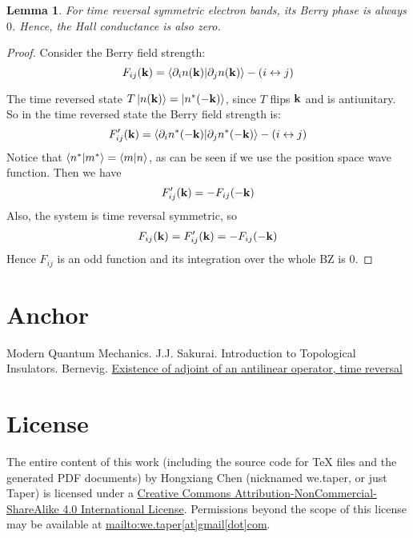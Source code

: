 \documentclass{article}
\numberwithin{equation}{subsection} %
\newtheorem{lemma}{Lemma}[section]
\theoremstyle{definition}
\begin{document}
        \begin{lemma}
            For time reversal symmetric electron bands, its Berry
            phase is always $0$. Hence, the Hall conductance is also
            zero.
        \end{lemma}
        \begin{proof}
            Consider the Berry field strength:
            $$F_{ij}(\vb{k}) = \braket{\partial_i n(\vb{k})|\partial_j
            n(\vb{k})} - (i \leftrightarrow j) $$

            The time reversed state $T\ket{n(\vb{k})}
            =\ket{n^*(-\vb{k})}$, since $T$ flips $\vb{k}$ and is
            antiunitary. So in the time reversed state the Berry field
            strength is:
            $$F'_{ij}(\vb{k}) = \braket{\partial_i n^*(-\vb{k})|\partial_j
            n^*(-\vb{k})} - (i \leftrightarrow j) $$
            Notice that $\braket{n^*|m^*} = \braket{m|n}$, as can be
            seen if we use the position space wave function. Then we
            have
            $$F'_{ij}(\vb{k}) = -F_{ij}(-\vb{k})$$
            Also, the system is time reversal symmetric, so
            \begin{align}
                F_{ij}(\vb{k}) = F'_{ij}(\vb{k}) = -F_{ij}(-\vb{k})
            \end{align}
            Hence $F_{ij}$ is an odd function and its integration over
            the whole BZ is $0$.
        \end{proof}
        
\section{Anchor}
\label{sec:Anchor}
\begin{thebibliography}{1}
     Modern Quantum Mechanics. J.J. Sakurai.
     Introduction to Topological Insulators. Bernevig.
    \href{http://physics.stackexchange.com/questions/45227/existence-of-adjoint-of-an-antilinear-operator-time-reversal}{Existence of adjoint of an antilinear operator, time reversal}
\end{thebibliography}
\printnomenclature
\section{License}
The entire content of this work (including the source code
for TeX files and the generated PDF documents) by 
Hongxiang Chen (nicknamed we.taper, or just Taper) is
licensed under a 
\href{http://creativecommons.org/licenses/by-nc-sa/4.0/}{Creative 
Commons Attribution-NonCommercial-ShareAlike 4.0 International 
License}. Permissions beyond the scope of this 
license may be available at \url{mailto:we.taper[at]gmail[dot]com}.
\end{document}
